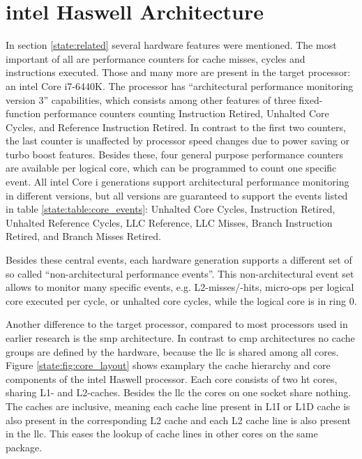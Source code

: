 
\section{\gls{intel} Haswell Architecture}
\label{state:haswell}

In section \ref{state:related} several hardware features were mentioned.
The most important of all are performance counters for cache misses, cycles and
instructions executed.
Those and many more are present in the target processor: an \gls{intel} Core
i7-6440K.
The processor has ``architectural performance monitoring version 3''
capabilities, which consists among other features of three fixed-function
performance counters counting Instruction Retired, Unhalted Core Cycles, and
Reference Instruction Retired.
In contrast to the first two counters, the last counter is unaffected by
processor speed changes due to power saving or turbo boost features.
Besides these, four general purpose performance counters are available per
logical core, which can be programmed to count one specific event.
All \gls{intel} Core i generations support architectural performance monitoring
in different versions, but all versions are guaranteed to support the events
listed in table \ref{state:table:core_events}: Unhalted Core Cycles,
Instruction Retired, Unhalted Reference Cycles, LLC Reference, LLC Misses,
Branch Instruction Retired, and Branch Misses Retired.

Besides these central events, each hardware generation supports a different set
of so called ``non-architectural performance events''.
This non-architectural event set allows to monitor many specific events, e.g.
L2-misses/-hits, micro-ops per logical core executed per cycle, or unhalted
core cycles, while the logical core is in ring 0.

Another difference to the target processor, compared to most processors used in
earlier research is the \gls{smp} architecture. In contrast to \gls{cmp}
architectures no cache groups are defined by the hardware, because the
\gls{llc} is shared among all cores.
Figure \ref{state:fig:core_layout} shows examplary the cache hierarchy and core
components of the \gls{intel} Haswell processor.
Each core consists of two \gls{ht} cores, sharing L1- and L2-caches.
Besides the \gls{llc} the cores on one socket share nothing.
The caches are inclusive, meaning each cache line present in L1I or L1D
cache is also present in the corresponding L2 cache and each L2 cache line is
also present in the \gls{llc}.
This eases the lookup of cache lines in other cores on the same package.

